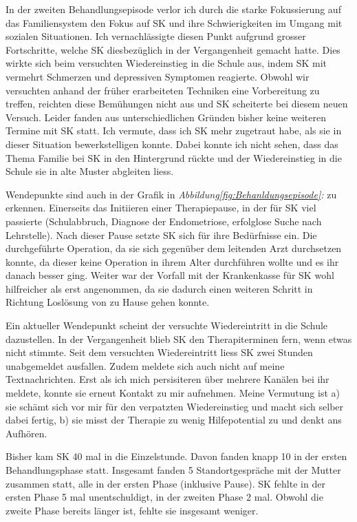 In der zweiten Behandlungsepisode verlor ich durch die starke Fokussierung auf das Familiensystem  den Fokus auf SK und ihre Schwierigkeiten im Umgang mit sozialen Situationen. Ich vernachlässigte diesen Punkt aufgrund grosser Fortschritte, welche SK diesbezüglich in der Vergangenheit gemacht hatte. Dies wirkte sich beim versuchten Wiedereinstieg in die Schule aus, indem SK mit vermehrt Schmerzen und depressiven Symptomen reagierte. Obwohl wir versuchten anhand der früher erarbeiteten Techniken eine Vorbereitung zu treffen, reichten diese Bemühungen nicht aus und SK scheiterte bei diesem neuen Versuch. Leider fanden aus unterschiedlichen Gründen bisher keine weiteren Termine mit SK statt. Ich vermute, dass ich SK mehr zugetraut habe, als sie in dieser Situation bewerkstelligen konnte. Dabei konnte ich nicht sehen, dass das Thema Familie bei SK in den Hintergrund rückte und der Wiedereinstieg in die Schule sie in alte Muster abgleiten liess.

Wendepunkte sind auch in der Grafik in \textit{Abbildung\ref{fig:Behanldungsepisode}: } zu erkennen. Einerseits das Initiieren einer Therapiepause, in der für SK viel passierte (Schulabbruch, Diagnose der Endometriose, erfolglose Suche nach Lehrstelle). Nach dieser Pause setzte SK sich für ihre Bedürfnisse ein. Die durchgeführte Operation, da sie sich gegenüber dem leitenden Arzt durchsetzen konnte, da dieser keine Operation in ihrem Alter durchführen wollte und es ihr danach besser ging. Weiter war der Vorfall mit der Krankenkasse für SK wohl hilfreicher als erst angenommen, da sie dadurch einen weiteren Schritt in Richtung Loslösung von zu Hause gehen konnte. 

Ein aktueller Wendepunkt scheint der versuchte Wiedereintritt in die Schule dazustellen. In der Vergangenheit blieb SK den Therapiterminen fern, wenn etwas nicht stimmte. Seit dem versuchten Wiedereintritt liess SK zwei Stunden unabgemeldet ausfallen. Zudem meldete sich auch nicht auf meine Textnachrichten. Erst als ich mich persisiteren über mehrere Kanälen bei ihr meldete, konnte sie erneut Kontakt zu mir aufnehmen. Meine Vermutung ist a) sie schämt sich vor mir für den verpatzten Wiedereinstieg und macht sich selber dabei fertig, b) sie misst der Therapie zu wenig Hilfepotential zu und denkt ans Aufhören.

Bisher kam SK 40 mal in die Einzelstunde. Davon fanden knapp 10 in der ersten Behandlungsphase statt. Insgesamt fanden 5 Standortgespräche mit der Mutter zusammen statt, alle in der ersten Phase (inklusive Pause). SK fehlte in der ersten Phase 5 mal unentschuldigt, in der zweiten Phase 2 mal. Obwohl die zweite Phase bereits länger ist, fehlte sie insgesamt weniger.


